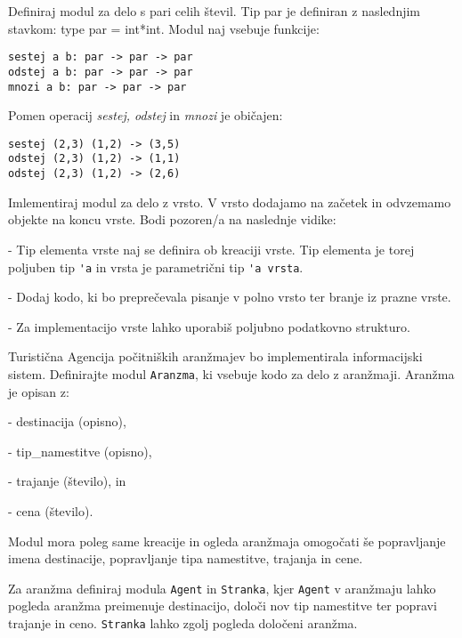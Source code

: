 \begin{ex}
Definiraj modul za delo s pari celih \v stevil. Tip par je definiran z
naslednjim stavkom: type par = int*int. Modul naj vsebuje funkcije:

\begin{lstlisting}
sestej a b: par -> par -> par
odstej a b: par -> par -> par
mnozi a b: par -> par -> par
\end{lstlisting}
Pomen operacij \emph{sestej, odstej} in \emph{mnozi} je obi\v cajen:
\begin{lstlisting}
sestej (2,3) (1,2) -> (3,5)
odstej (2,3) (1,2) -> (1,1)
odstej (2,3) (1,2) -> (2,6)
\end{lstlisting}

\end{ex}
\begin{ex}

Imlementiraj modul za delo z vrsto. V vrsto dodajamo na za\v cetek in
odvzemamo objekte na koncu vrste. Bodi pozoren/a na naslednje vidike:

- Tip elementa vrste naj se definira ob kreaciji vrste. Tip elementa
  je torej poljuben tip \lstinline{'a} in vrsta je parametri\v cni tip \lstinline{'a vrsta}.
  
- Dodaj kodo, ki bo prepre\v cevala pisanje v polno vrsto ter branje iz
  prazne vrste.
  
- Za implementacijo vrste lahko uporabi\v s poljubno podatkovno strukturo.

\end{ex}
\begin{ex}
Turisti\v cna Agencija po\v citni\v skih aran\v zmajev bo implementirala
informacijski sistem.
Definirajte modul \lstinline{Aranzma}, ki vsebuje kodo za delo z
aran\v zmaji. Aran\v zma je opisan z:

- destinacija (opisno), 

- tip\_namestitve (opisno), 

- trajanje (\v stevilo), in 

- cena (\v stevilo).

Modul mora poleg same kreacije in ogleda aran\v zmaja omogo\v cati \v se
popravljanje imena destinacije, popravljanje tipa namestitve, trajanja
in cene.

Za aran\v zma definiraj modula \lstinline{Agent} in \lstinline{Stranka}, kjer \lstinline{Agent} v aran\v zmaju
lahko pogleda aran\v zma preimenuje destinacijo, dolo\v ci nov tip
namestitve ter popravi trajanje in ceno. \lstinline{Stranka} lahko zgolj pogleda
dolo\v ceni aran\v zma.



\end{ex}
